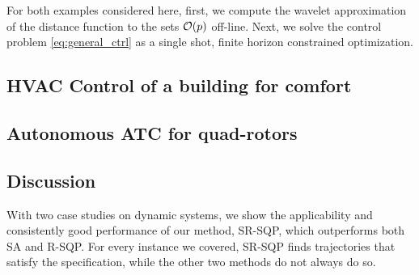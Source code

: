 For both examples considered here, first, we compute the wavelet approximation of the distance function to the sets $\mathcal{O}(p)$ off-line. Next, we solve the control problem \eqref{eq:general_ctrl} as a single shot, finite horizon constrained optimization. 


\subsection{HVAC Control of a building for comfort}


\subsection{Autonomous ATC for quad-rotors}
\label{sec:ATCquad}


\subsection{Discussion}
With two case studies on dynamic systems, we show the applicability and consistently good performance of our method, SR-SQP, which outperforms both SA and R-SQP. For every instance we covered, SR-SQP finds trajectories that satisfy the specification, while the other two methods do not always do so.


